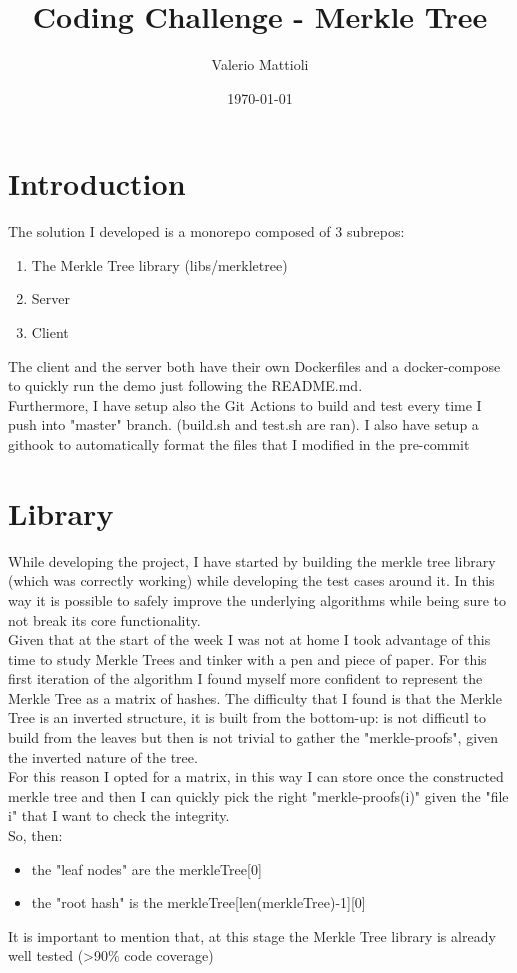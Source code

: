 \documentclass[11pt]{article}
\author{Valerio Mattioli}
\date{\today}
\title{Coding Challenge - Merkle Tree}
\begin{document}
\maketitle
\tableofcontents


\section{Introduction}
\label{sec:org2a77370}
The solution I developed is a monorepo composed of 3 subrepos:
\begin{enumerate}
\item The Merkle Tree library (libs/merkletree)
\item Server
\item Client
\end{enumerate}
The client and the server both have their own Dockerfiles and a docker-compose to quickly run the demo just following the README.md.\\[0pt]
Furthermore, I have setup also the Git Actions to build and test every time I push into "master" branch. (build.sh and test.sh are ran).
I also have setup a githook to automatically format the files that I modified in the pre-commit
\section{Library}
\label{sec:org25a9d82}
While developing the project, I have started by building the merkle tree library (which was correctly working)
while developing the test cases around it. In this way it is possible to safely improve the underlying algorithms while being sure to not break its core functionality.\\[0pt]
Given that at the start of the week I was not at home I took advantage of this time to study Merkle Trees and tinker with a pen and piece of paper.
For this first iteration of the algorithm I found myself more confident to represent the Merkle Tree as a matrix of hashes. The difficulty that I found is that the Merkle Tree is an inverted structure, it is built from the bottom-up: is not difficutl to build from the leaves but then is not trivial to gather the "merkle-proofs", given the inverted nature of the tree.\\[0pt]
For this reason I opted for a matrix, in this way I can store once the constructed merkle tree and then I can quickly pick the right "merkle-proofs(i)" given the "file i" that I want to check the integrity.\\[0pt]
So, then:
\begin{itemize}
\item the "leaf nodes" are the merkleTree[0]
\item the "root hash" is the merkleTree[len(merkleTree)-1][0]
\end{itemize}
It is important to mention that, at this stage the Merkle Tree library is already well tested (>90\% code coverage)
\end{document}
